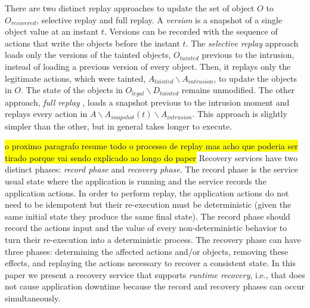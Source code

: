 There are two distinct replay approaches to update the set of object $O$ to $O_{recovered}$, 
selective replay and full replay. 
A \textit{version} is a snapshot of a single object value at an instant $t$. Versions can be recorded with the sequence of actions that write the objects before the instant $t$.
The \textit{selective replay} approach \cite{taser,warp,goel} loads only the versions of the tainted objects, $O_{tainted}$ previous to the intrusion, instead of loading a previous version of every object. Then, it replays only the legitimate actions, which were tainted, $A_{tainted} \backslash A_{intrusion}$, to update the objects in $O$. The state of the objects in $O_{legal} \backslash D_{tainted}$ remains unmodified. 
The other approach, \textit{full replay} \cite{undoForOperators}, loads a snapshot previous to the intrusion moment and replays every action in $A \backslash A_{snapshot}(t) \backslash A_{intrusion}$. This approach is slightly simpler than the other, but in general takes longer to execute. 



\hl{o proximo paragrafo resume todo o processo de replay mas acho que poderia ser tirado porque vai sendo explicado ao longo do paper}
Recovery services have two distinct phases: \textit{record phase} and \textit{recovery phase}. The record phase is the service usual state where the application is running and the service records the application actions. In order to perform replay, the application actions do not need to be idempotent but their re-execution must be deterministic (given the same initial state they produce the same final state). The record phase should record the actions input and the value of every non-deterministic behavior to turn their re-execution into a deterministic process. The recovery phase can have three phases: determining the affected actions and/or objects, removing these effects, and replaying the actions necessary to recover a consistent state. In this paper we present a recovery service that supports \textit{runtime recovery}, i.e., that does not cause application downtime because the record and recovery phases can occur simultaneously.

